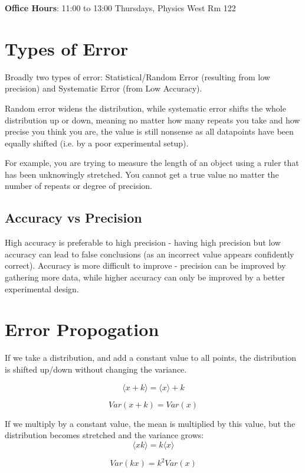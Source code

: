 \graphicspath{{figures/}}

\textbf{Office Hours}: 11:00 to 13:00 Thursdays, Physics West Rm 122

\section*{Types of Error}
Broadly two types of error: Statistical/Random Error (resulting from low precision) and Systematic Error (from Low Accuracy).

Random error widens the distribution, while systematic error shifts the whole distribution up or down, meaning no matter how many repeats you take and how precise you think you are, the value is still nonsense as all datapoints have been equally shifted (i.e. by a poor experimental setup).

For example, you are trying to measure the length of an object using a ruler that has been unknowingly stretched. You cannot get a true value no matter the number of repeats or degree of precision.

\subsection*{Accuracy vs Precision}
High accuracy is preferable to high precision - having high precision but low accuracy can lead to false conclusions (as an incorrect value appears confidently correct). Accuracy is more difficult to improve - precision can be improved by gathering more data, while higher accuracy can only be improved by a better experimental design.

\section*{Error Propogation}
If we take a distribution, and add a constant value to all points, the distribution is shifted up/down without changing the variance.

\[
    \langle x+k \rangle = \langle x \rangle + k
\]

\[
    Var(x+k) = Var(x)
\]

If we multiply by a constant value, the mean is multiplied by this value, but the distribution becomes stretched and the variance grows:
\[
    \langle xk \rangle = k \langle x \rangle
\]

\[
    Var(kx) = k^2 Var(x)
\]

